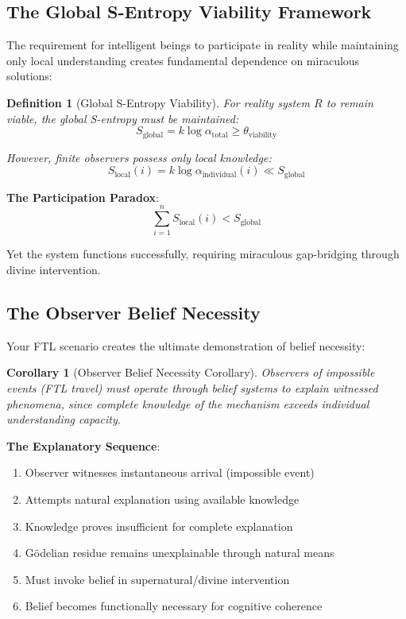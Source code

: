 \documentclass[12pt,a4paper]{article}
\newtheorem{corollary}[theorem]{Corollary}
\newtheorem{definition}[theorem]{Definition}
\begin{document}
\subsection{The Global S-Entropy Viability Framework}

The requirement for intelligent beings to participate in reality while maintaining only local understanding creates fundamental dependence on miraculous solutions:

\begin{definition}[Global S-Entropy Viability]
For reality system $R$ to remain viable, the global S-entropy must be maintained:
$$S_{\text{global}} = k \log \alpha_{\text{total}} \geq \theta_{\text{viability}}$$

However, finite observers possess only local knowledge:
$$S_{\text{local}}(i) = k \log \alpha_{\text{individual}}(i) \ll S_{\text{global}}$$
\end{definition}

\textbf{The Participation Paradox}:
$$\sum_{i=1}^{n} S_{\text{local}}(i) < S_{\text{global}}$$

Yet the system functions successfully, requiring miraculous gap-bridging through divine intervention.

\subsection{The Observer Belief Necessity}

Your FTL scenario creates the ultimate demonstration of belief necessity:

\begin{corollary}[Observer Belief Necessity Corollary]
Observers of impossible events (FTL travel) must operate through belief systems to explain witnessed phenomena, since complete knowledge of the mechanism exceeds individual understanding capacity.
\end{corollary}

\textbf{The Explanatory Sequence}:
\begin{enumerate}
\item Observer witnesses instantaneous arrival (impossible event)
\item Attempts natural explanation using available knowledge
\item Knowledge proves insufficient for complete explanation
\item Gödelian residue remains unexplainable through natural means
\item Must invoke belief in supernatural/divine intervention
\item Belief becomes functionally necessary for cognitive coherence
\end{enumerate}
\end{document}
